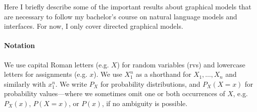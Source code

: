 Here I briefly describe some of the important results about graphical models that are necessary to follow my bachelor's course on natural language models and interfaces. For now, I only cover directed graphical models.


\paragraph{Notation}

We use capital Roman letters (e.g. $X$) for random variables (rvs) and lowercase letters for assignments (e.g. $x$). We use $X_1^n$ as a shorthand for $X_1, \ldots, X_n$ and similarly with $x_1^n$. 
We write $P_X$ for probability distributions, and $P_X(X=x)$ for probability values---where we sometimes omit one or both occurrences of $X$, e.g. $P_X(x)$, $P(X=x)$, or $P(x)$, if no ambiguity is possible. 


